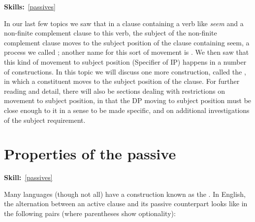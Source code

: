 \documentclass{article}
\begin{document}
\maketitle
\subtitle{Topic 11 Course Notes: Passives}
\hfill{}\textbf{Skills:}~\ref{passives}

In our last few topics we saw that in a clause containing a verb like \emph{seem} and a non-finite complement clause to this verb, the subject of the non-finite complement clause moves to the subject position of the clause containing seem, a process we called ; another name for this sort of movement is . We then saw that this kind of movement to subject position (Specifier of IP) happens in a number of constructions. In this topic we will discuss one more construction, called the , in which a constituent moves to the subject position of the clause. For further reading and detail, there will also be sections dealing with  restrictions on movement to subject position, in that the DP moving to subject position must be close enough to it in a sense to be made specific, and on additional investigations of the subject requirement.

\section{Properties of the passive}
\hfill{}\textbf{Skill:}~\ref{passives}

Many languages (though not all) have a construction known as the . In English, the alternation between an active clause and its passive counterpart looks like in the following pairs (where parentheses show optionality):
\begin{exe}
\begin{multicols}{2}
    \label{passive_examples_1}
    \label{passive_examples_2}
\end{multicols}
\end{exe}
\end{document}
